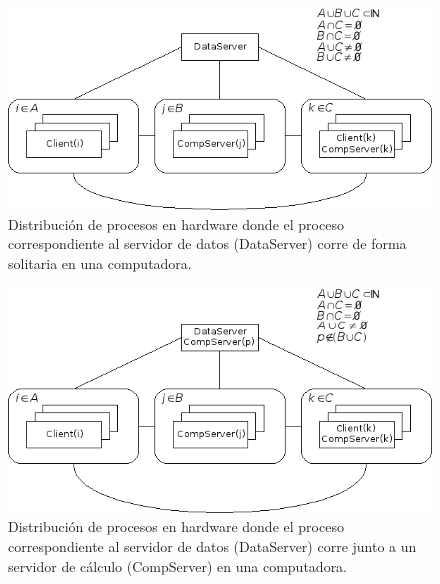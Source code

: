 \documentclass[a4paper,11pt]{article}
\begin{document}
\begin{figure}
\begin{center}
\includegraphics[scale=0.7]{./EstructuraFisica01.png}
\end{center}
\caption{Distribución de procesos en hardware donde el proceso correspondiente al servidor de datos (DataServer) corre de forma solitaria en una computadora.}
\end{figure}


\begin{figure}
\begin{center}
\includegraphics[scale=0.7]{./EstructuraFisica02.png}
\end{center}
\caption{Distribución de procesos en hardware donde el proceso correspondiente al servidor de datos (DataServer) corre junto a un servidor de cálculo (CompServer) en una computadora.}
\end{figure}
\end{document}
